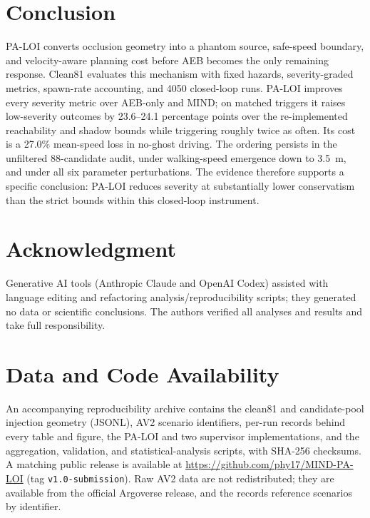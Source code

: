 \documentclass[journal]{IEEEtran}
\begin{document}
\section{Conclusion}

PA-LOI converts occlusion geometry into a phantom source, safe-speed boundary, and velocity-aware planning cost before AEB becomes the only remaining response. Clean81 evaluates this mechanism with fixed hazards, severity-graded metrics, spawn-rate accounting, and 4050 closed-loop runs. PA-LOI improves every severity metric over AEB-only and MIND; on matched triggers it raises low-severity outcomes by 23.6--24.1 percentage points over the re-implemented reachability and shadow bounds while triggering roughly twice as often. Its cost is a 27.0\% mean-speed loss in no-ghost driving. The ordering persists in the unfiltered 88-candidate audit, under walking-speed emergence down to \SI{3.5}{m}, and under all six parameter perturbations. The evidence therefore supports a specific conclusion: PA-LOI reduces severity at substantially lower conservatism than the strict bounds within this closed-loop instrument.

\section*{Acknowledgment}
Generative AI tools (Anthropic Claude and OpenAI Codex) assisted with language editing and refactoring analysis/reproducibility scripts; they generated no data or scientific conclusions. The authors verified all analyses and results and take full responsibility.

\section*{Data and Code Availability}

An accompanying reproducibility archive contains the clean81 and candidate-pool injection geometry (JSONL), AV2 scenario identifiers, per-run records behind every table and figure, the PA-LOI and two supervisor implementations, and the aggregation, validation, and statistical-analysis scripts, with SHA-256 checksums. A matching public release is available at \url{https://github.com/phy17/MIND-PA-LOI} (tag \texttt{v1.0-submission}). Raw AV2 data are not redistributed; they are available from the official Argoverse release, and the records reference scenarios by identifier.



\end{document}
